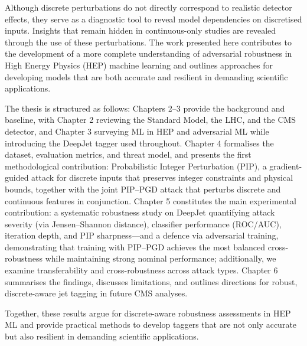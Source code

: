Although discrete perturbations do not directly correspond to realistic detector effects, they serve as a diagnostic tool to reveal model dependencies on discretised inputs. Insights that remain hidden in continuous-only studies are revealed through the use of these perturbations. The work presented here contributes to the development of a more complete understanding of adversarial robustness in High Energy Physics (HEP) machine learning and outlines approaches for developing models that are both accurate and resilient in demanding scientific applications.

\newpage
The thesis is structured as follows: Chapters 2–3 provide the background and baseline, with Chapter 2 reviewing the Standard Model, the LHC, and the CMS detector, and Chapter 3 surveying ML in HEP and adversarial ML while introducing the DeepJet tagger used throughout. Chapter 4 formalises the dataset, evaluation metrics, and threat model, and presents the first methodological contribution: Probabilistic Integer Perturbation (PIP), a gradient-guided attack for discrete inputs that preserves integer constraints and physical bounds, together with the joint PIP–PGD attack that perturbs discrete and continuous features in conjunction. Chapter 5 constitutes the main experimental contribution: a systematic robustness study on DeepJet quantifying attack severity (via Jensen–Shannon distance), classifier performance (ROC/AUC), iteration depth, and PIP sharpness—and a defence via adversarial training, demonstrating that training with PIP–PGD achieves the most balanced cross-robustness while maintaining strong nominal performance; additionally, we examine transferability and cross-robustness across attack types. Chapter 6 summarises the findings, discusses limitations, and outlines directions for robust, discrete-aware jet tagging in future CMS analyses.

Together, these results argue for discrete-aware robustness assessments in HEP ML and provide practical methods to develop taggers that are not only accurate but also resilient in demanding scientific applications.
